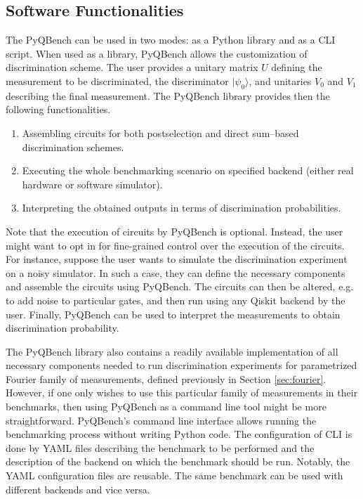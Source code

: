 \documentclass[preprint,12pt, a4paper, dvipsnames]{elsarticle}
\newcommand{\ket}[1]{\ensuremath{|#1\rangle}}
\newcommand{\1}{{\rm 1\hspace{-0.9mm}l}}
\theoremstyle{definition}
\begin{document}
\subsection{Software Functionalities}\label{sec:sortware-functionalities}

The PyQBench can be used in two modes: as a Python library and as a CLI script. When used as a
library, PyQBench allows the customization of discrimination scheme. The user provides
a unitary matrix $U$ defining the measurement to be discriminated, the discriminator $\ket{\psi_0}$,
and unitaries $V_0$ and $V_1$ describing the final measurement. The PyQBench library provides then
the following functionalities.

\begin{enumerate}
	\item Assembling circuits for both postselection and direct sum--based discrimination schemes.
	\item Executing the whole benchmarking scenario on specified backend (either real hardware or
	software simulator).
	\item Interpreting the obtained outputs in terms of discrimination probabilities.
\end{enumerate}
Note that the execution of circuits by PyQBench is optional. Instead, the user might want to opt in for
fine-grained control over the execution of the circuits. For instance, suppose the user wants to
simulate the discrimination experiment on a noisy simulator. In such a case, they can define
the necessary components and assemble the circuits using PyQBench. The circuits can then be altered,
e.g. to add noise to particular gates, and then run using any Qiskit backend by the user. Finally,
PyQBench can be used to interpret the measurements to obtain discrimination probability.

The PyQBench library also contains a readily available implementation of all necessary components
needed to run discrimination experiments for parametrized Fourier family of measurements, defined
previously in Section \ref{sec:fourier}. However, if one only wishes to use this particular family
of measurements in their benchmarks, then using PyQBench as a command line tool might be more straightforward. PyQBench's command line interface allows running the benchmarking process without
writing Python code. The configuration of CLI is done by YAML \cite{yaml} files describing the benchmark
to be performed and the description of the backend on which the benchmark should be run. Notably,
the YAML configuration files are reusable. The same benchmark can be used with different backends
and vice versa.
\end{document}
